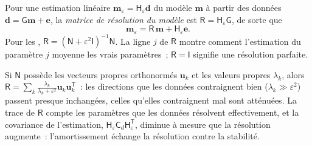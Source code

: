 \begin{definition}\label{def:b3:seismology-imaging:resolution}
Pour une estimation linéaire $\mathbf m_\varepsilon = \mathsf H_\varepsilon \mathbf d$
du modèle $\mathbf m$ à partir des données $\mathbf d = \mathsf G\mathbf m + \mathbf e$,
la \emph{matrice de résolution du modèle} est
$\mathsf R = \mathsf H_\varepsilon\mathsf G$, de sorte que
\[
  \mathbf m_\varepsilon = \mathsf R\,\mathbf m + \mathsf H_\varepsilon\mathbf e .
\]
Pour les , $\mathsf R = (\mathsf N + \varepsilon^2\mathsf I)^{-1}
\mathsf N$. La ligne $j$ de $\mathsf R$ montre comment l'estimation du paramètre $j$
moyenne les vrais paramètres~; $\mathsf R = \mathsf I$ signifie une résolution parfaite.
\end{definition}

{\sloppy Si $\mathsf N$ possède les vecteurs propres orthonormés $\mathbf u_k$ et les valeurs
propres $\lambda_k$, alors $\mathsf R = \sum_k \frac{\lambda_k}{\lambda_k + \varepsilon^2}
\mathbf u_k\mathbf u_k^{\mathsf T}$~: les directions que les données contraignent bien
($\lambda_k \gg \varepsilon^2$) passent presque inchangées, celles qu'elles contraignent
mal sont atténuées. La trace de $\mathsf R$ compte les paramètres que les données
résolvent effectivement, et la covariance de l'estimation,
$\mathsf H_\varepsilon\mathsf C_d\mathsf H_\varepsilon^{\mathsf T}$, diminue à mesure
que la résolution augmente~: l'amortissement échange la résolution contre la stabilité.\par}

